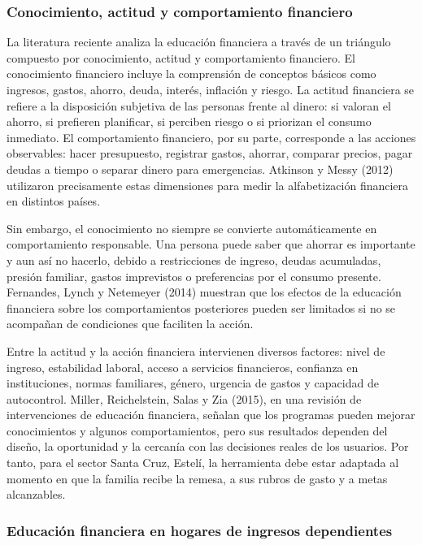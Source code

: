 \documentclass[12pt,letterpaper]{article}
\begin{document}
\subsubsection{\texorpdfstring{\textbf{Conocimiento, actitud y comportamiento financiero}}{Conocimiento, actitud y comportamiento financiero}}\label{conocimiento-actitud-y-comportamiento-financiero}

La literatura reciente analiza la educación financiera a través de un triángulo compuesto por conocimiento, actitud y comportamiento financiero. El conocimiento financiero incluye la comprensión de conceptos básicos como ingresos, gastos, ahorro, deuda, interés, inflación y riesgo. La actitud financiera se refiere a la disposición subjetiva de las personas frente al dinero: si valoran el ahorro, si prefieren planificar, si perciben riesgo o si priorizan el consumo inmediato. El comportamiento financiero, por su parte, corresponde a las acciones observables: hacer presupuesto, registrar gastos, ahorrar, comparar precios, pagar deudas a tiempo o separar dinero para emergencias. Atkinson y Messy (2012) utilizaron precisamente estas dimensiones para medir la alfabetización financiera en distintos países.

Sin embargo, el conocimiento no siempre se convierte automáticamente en comportamiento responsable. Una persona puede saber que ahorrar es importante y aun así no hacerlo, debido a restricciones de ingreso, deudas acumuladas, presión familiar, gastos imprevistos o preferencias por el consumo presente. Fernandes, Lynch y Netemeyer (2014) muestran que los efectos de la educación financiera sobre los comportamientos posteriores pueden ser limitados si no se acompañan de condiciones que faciliten la acción.

Entre la actitud y la acción financiera intervienen diversos factores: nivel de ingreso, estabilidad laboral, acceso a servicios financieros, confianza en instituciones, normas familiares, género, urgencia de gastos y capacidad de autocontrol. Miller, Reichelstein, Salas y Zia (2015), en una revisión de intervenciones de educación financiera, señalan que los programas pueden mejorar conocimientos y algunos comportamientos, pero sus resultados dependen del diseño, la oportunidad y la cercanía con las decisiones reales de los usuarios. Por tanto, para el sector Santa Cruz, Estelí, la herramienta debe estar adaptada al momento en que la familia recibe la remesa, a sus rubros de gasto y a metas alcanzables.

\subsubsection{\texorpdfstring{\textbf{Educación financiera en hogares de ingresos dependientes}}{Educación financiera en hogares de ingresos dependientes}}\label{educaciuxf3n-financiera-en-hogares-de-ingresos-dependientes}
\end{document}
